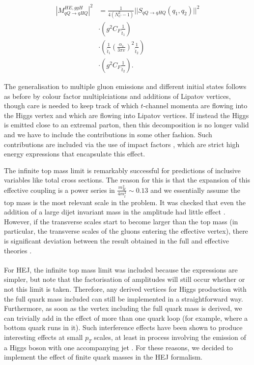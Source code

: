 \begin{equation}
\begin{split}
|M_{qQ \to qHQ}^{HE,ggH}|^2 &= \frac{1}{4(N_C^2 - 1)} ||S_{qQ \to qHQ}(q_1, q_2)||^2 \\
& \cdot \left(g^2 C_F \frac{1}{\hat{t}_1} \right) \\
& \cdot \left(\frac{1}{\hat{t}_1} \left(\frac{\alpha_s}{3 \pi v} \right)^2 \frac{1}{\hat{t}_2} \right) \\
& \cdot \left(g^2 C_F \frac{1}{\hat{t}_2} \right).
\end{split}
\end{equation}

The generalisation to multiple gluon emissions and different initial states follows as before by colour factor multiplciations and additions of Lipatov vertices, though care is needed to keep track of which $t$-channel momenta are flowing into the Higgs vertex and which are flowing into Lipatov vertices. If instead the Higgs is emitted close to an extremal parton, then this decomposition is no longer valid and we have to include the contributions in some other fashion. Such contributions are included via the use of impact factors \cite{Duca2003}, which are strict high energy expressions that encapsulate this effect.  

The infinite top mass limit is remarkably successful for predictions of inclusive variables like total cross sections. The reason for this is that the expansion of this effective coupling is a power series in $\frac{m_H^2}{4 m_t^2} \sim 0.13$ and we essentially assume the top mass is the most relevant scale in the problem. It was checked that even the addition of a large dijet invariant mass in the amplitude had little effect \cite{Duca2003}. However, if the transverse scales start to become larger than the top mass (in particular, the transverse scales of the gluons entering the effective vertex), there is significant deviation between the result obtained in the full and effective theories \cite{Duca2003}. \\
\\
For HEJ, the infinite top mass limit was included because the expressions are simpler, but note that the factorisation of amplitudes will still occur whether or not this limit is taken. Therefore, any derived vertices for Higgs production with the full quark mass included can still be implemented in a straightforward way. Furthermore, as soon as the vertex including the full quark mass is derived, we can trivially add in the effect of more than one quark loop (for example, where a bottom quark runs in it). Such interference effects have been shown to produce interesting effects at small $p_T$ scales, at least in process involving the emission of a Higgs boson with one accompanying jet \cite{Grazzini2013, Lindert2017}. For these reasons, we decided to implement the effect of finite quark masses in the HEJ formalism. 


